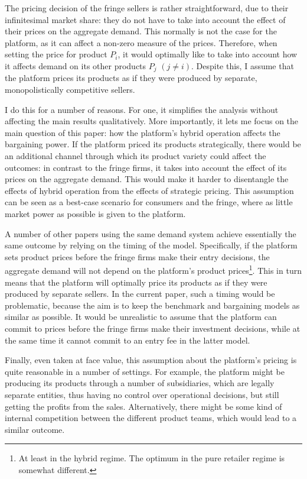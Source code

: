 \documentclass[a4paper]{article}
\begin{document}
The pricing decision of the fringe sellers is rather straightforward, due to their infinitesimal market share: they do not have to take into account the effect of their prices on the aggregate demand.
This normally is not the case for the platform, as it can affect a non-zero measure of the prices.
Therefore, when setting the price for product $P_i$, it would optimally like to take into account how it affects demand on its other products $P_j$ $(j \neq i)$.
Despite this, I assume that the platform prices its products as if they were produced by separate, monopolistically competitive sellers.

I do this for a number of reasons.
For one, it simplifies the analysis without affecting the main results qualitatively.  %
More importantly, it lets me focus on the main question of this paper: how the platform's hybrid operation affects the bargaining power.
If the platform priced its products strategically, there would be an additional channel through which its product variety could affect the outcomes: in contrast to the fringe firms, it takes into account the effect of its prices on the aggregate demand.
This would make it harder to disentangle the effects of hybrid operation from the effects of strategic pricing.
This assumption can be seen as a best-case scenario for consumers and the fringe, where as little market power as possible is given to the platform.

A number of other papers using the same demand system \parencite[e.g.][]{anderson2020aggregative,anderson2021hybrid} achieve essentially the same outcome by relying on the timing of the model.
Specifically, if the platform sets product prices before the fringe firms make their entry decisions, the aggregate demand will not depend on the platform's product prices\footnote{
    At least in the hybrid regime.
    The optimum in the pure retailer regime is somewhat different.
}.
This in turn means that the platform will optimally price its products as if they were produced by separate sellers.
In the current paper, such a timing would be problematic, because the aim is to keep the benchmark and bargaining models as similar as possible.
It would be unrealistic to assume that the platform can commit to prices before the fringe firms make their investment decisions, while at the same time it cannot commit to an entry fee in the latter model.

Finally, even taken at face value, this assumption about the platform's pricing is quite reasonable in a number of settings.
For example, the platform might be producing its products through a number of subsidiaries, which are legally separate entities, thus having no control over operational decisions, but still getting the profits from the sales.
Alternatively, there might be some kind of internal competition between the different product teams, which would lead to a similar outcome.
\end{document}
